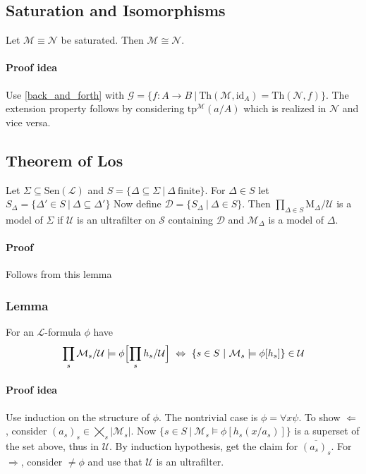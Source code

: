 \documentclass{scrartcl}
\begin{document}
\subsection{Saturation and Isomorphisms}
Let $\mathcal{M} \equiv \mathcal{N}$ be saturated. Then $\mathcal{M} \cong \mathcal{N}$.
\paragraph{Proof idea} 
Use \ref{back_and_forth} with $\mathcal{G} = \{ f: A \to B \ | \ \mathrm{Th}(\mathcal{M}, \mathrm{id}_A) = \mathrm{Th}(\mathcal{N}, f)\}$.
The extension property follows by considering $\mathrm{tp}^{\mathcal{M}}(a/A)$ which is realized in $\mathcal{N}$ and vice versa.

\subsection{Theorem of Los}
Let $\Sigma \subseteq \mathrm{Sen}(\mathcal{L})$ and $S = \{ \Delta \subseteq \Sigma \ | \ \Delta \ \text{finite}\}$.
For $\Delta \in S$ let $S_\Delta = \{ \Delta' \in S \ | \ \Delta \subseteq \Delta' \}$
Now define $\mathcal{D} = \{ S_\Delta \ | \ \Delta \in S \}$.
Then $\prod_{\Delta \in S} \mathrm{M}_\Delta / \mathcal{U}$ is a model of $\Sigma$ if $\mathcal{U}$ is an ultrafilter on $\mathcal{S}$ containing $\mathcal{D}$ and $\mathcal{M}_\Delta$ is a model of $\Delta$.
\paragraph{Proof} Follows from this lemma

\subsubsection{Lemma}
For an $\mathcal{L}$-formula $\phi$ have
\begin{equation*}
    \prod_s \mathcal{M}_s / \mathcal{U} \models \phi \Bigl[ \prod_s h_s / \mathcal{U} \Bigr] \ \Leftrightarrow \ \{ s \in S \ | \ \mathcal{M}_s \models \phi[h_s] \} \in \mathcal{U}
\end{equation*}
\paragraph{Proof idea} Use induction on the structure of $\phi$. The nontrivial case is $\phi = \forall x \psi$.
To show $\Leftarrow$, consider $(a_s)_s \in \bigtimes_s |\mathcal{M}_s|$. 
Now $\{ s \in S \ | \ \mathcal{M}_s \models \phi[h_s(x / a_s)]\}$ is a superset of the set above, thus in $\mathcal{U}$.
By induction hypothesis, get the claim for $\overline{(a_s)_s}$.
For $\Rightarrow$, consider $\neq\phi$ and use that $\mathcal{U}$ is an ultrafilter.
\end{document}
